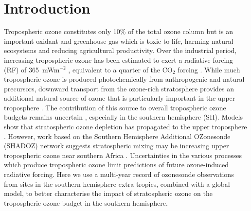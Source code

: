 \section{Introduction}
  Tropospheric ozone constitutes only 10\% of the total ozone column but is an important oxidant and greenhouse gas which is toxic to life, harming natural ecosystems and reducing agricultural productivity.
  Over the industrial period, increasing tropospheric ozone has been estimated to exert a radiative forcing (RF) of 365~mWm$^{-2}$  \citep{Stevenson2013}, equivalent to a quarter of the CO$_2$ forcing \citep{IPCC_Chapter2}. 
  While much tropospheric ozone is produced photochemically from anthropogenic and natural precursors, %
  downward transport from the ozone-rich stratosphere provides an additional natural source of ozone that is particularly important in the upper troposphere \citep[][and references therein]{Jacobson2000}.
  The contribution of this source to overall tropospheric ozone budgets remains uncertain \citep{Skerlak2014}, especially in the southern hemisphere (SH).
  Models show that stratospheric ozone depletion has propagated to the upper troposphere \citep{Stevenson2013}. 
  However, work based on the Southern Hemisphere Additional OZonesonde (SHADOZ) network suggests stratospheric mixing may be increasing upper tropospheric ozone near southern Africa \citep{Liu2015, Thompson2014}.
  Uncertainties in the various processes which produce tropospheric ozone limit predictions of future ozone-induced radiative forcing.
  Here we use a multi-year record of ozonesonde observations from sites in the southern hemisphere extra-tropics, combined with a global model, to better characterise the impact of stratospheric ozone on the tropospheric ozone budget in the southern hemisphere.
  
